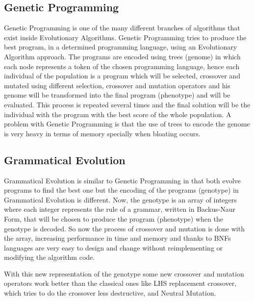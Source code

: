 \documentclass{llncs}
\begin{document}
\subsection{Genetic Programming}
Genetic Programming is one of the many different branches of algorithms that exist inside Evolutionary Algorithms.
Genetic Programming tries to produce the best program, in a determined programming language, using an Evolutionary Algorithm approach. The programs are encoded using trees (genome)  in which each node represents a token of the chosen programming language, hence each individual of the population is a program which will be selected, crossover and mutated using different selection, crossover and mutation operators and his genome will be transformed into the final program (phenotype) and will be evaluated. This process is repeated several times and the final solution will be the individual with the program with the best score of the whole population. A problem with Genetic Programming is that the use of trees to encode the genome is very heavy in terms of memory specially when bloating occurs.  %
\subsection{Grammatical Evolution}
Grammatical Evolution is similar to Genetic Programming in that both evolve programs to find the best one but the encoding of the programs (genotype) in Grammatical Evolution is different. Now, the genotype is an array of integers where each integer represents the rule of a grammar, written in Backus-Naur Form,
that will be chosen to produce the program (phenotype) when the genotype is decoded. So now the process of crossover and mutation is done with the array, increasing performance in time and memory and thanks to BNFs languages are very easy to design and change without reimplementing or modifying the algorithm code.%

With this new representation of the genotype some new crossover and mutation operators work better than the classical ones like LHS replacement crossover, which tries to do the crossover less destructive,
and Neutral Mutation. %
\end{document}

